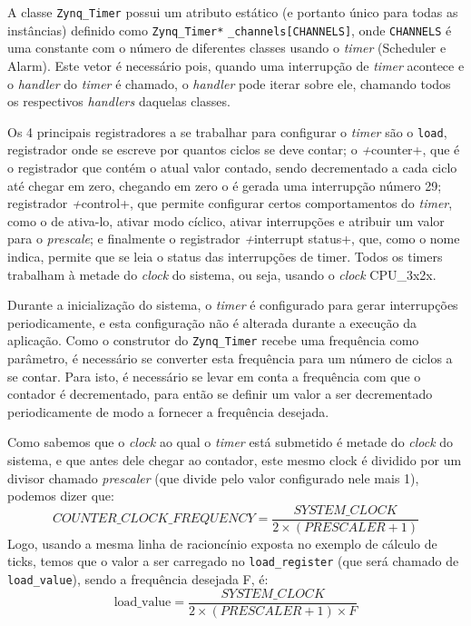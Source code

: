 \documentclass{ufscThesis/ufscThesis} %
\begin{document}
A classe \verb+Zynq_Timer+ possui um atributo estático (e portanto único para todas as instâncias) definido como \verb+Zynq_Timer*+ \verb+_channels[CHANNELS]+, onde \verb+CHANNELS+ é uma constante com o número de diferentes classes usando o \emph{timer} (Scheduler e Alarm). Este vetor é necessário pois, quando uma interrupção de \emph{timer} acontece e o \emph{handler} do \emph{timer} é chamado, o \emph{handler} pode iterar sobre ele, chamando todos os respectivos \emph{handlers} daquelas classes.


Os 4 principais registradores a se trabalhar para configurar o \emph{timer} são o \verb+load+, registrador onde se escreve por quantos ciclos se deve contar; o \emph+counter+, que é o registrador que contém o atual valor contado, sendo decrementado a cada ciclo até chegar em zero, chegando em zero o é gerada uma interrupção número 29; registrador \emph+control+, que permite configurar certos comportamentos do \emph{timer}, como o de ativa-lo, ativar modo cíclico, ativar interrupções e atribuir um valor para o \emph{prescale}; e finalmente o registrador \emph+interrupt status+, que, como o nome indica, permite que se leia o status das interrupções de timer. Todos os timers trabalham à metade do \emph{clock} do sistema, ou seja, usando o \emph{clock} CPU\_3x2x.

Durante a inicialização do sistema, o \emph{timer} é configurado para gerar interrupções periodicamente, e esta configuração não é alterada durante a execução da aplicação. Como o construtor do \verb+Zynq_Timer+ recebe uma frequência como parâmetro, é necessário se converter esta frequência para um número de ciclos a se contar. Para isto, é necessário se levar em conta a frequência com que o contador é decrementado, para então se definir um valor a ser decrementado periodicamente de modo a fornecer a frequência desejada.

Como sabemos que o \emph{clock} ao qual o \emph{timer} está submetido é metade do \emph{clock} do sistema, e que antes dele chegar ao contador, este mesmo clock é dividido por um divisor chamado \emph{prescaler} (que divide pelo valor configurado nele mais 1), podemos dizer que:
\[
	COUNTER\_CLOCK\_FREQUENCY = \frac{SYSTEM\_CLOCK}{2 \times (PRESCALER+1)}
\]
Logo, usando a mesma linha de racioncínio exposta no exemplo de cálculo de ticks, temos que o valor a ser carregado no \verb+load_register+ (que será chamado de \verb+load_value+), sendo a frequência desejada F, é:
\begin{equation}
	\text{load\_value} = \frac{SYSTEM\_CLOCK}{2 \times (PRESCALER+1) \times F}
\end{equation}
\end{document}
